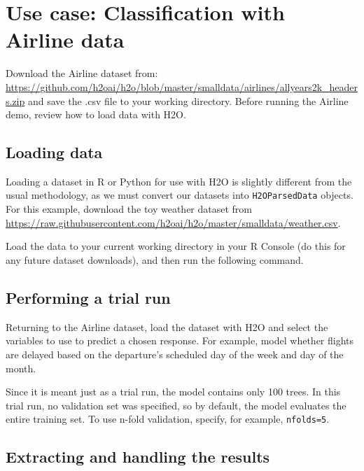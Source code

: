 \section{Use case: Classification with Airline data}

Download the Airline dataset from: {\url{https://github.com/h2oai/h2o/blob/master/smalldata/airlines/allyears2k_headers.zip}} and save the .csv file to your working directory. Before running the Airline demo, review how to load data with H2O.

\subsection{Loading data}

Loading a dataset in R or Python for use with H2O is slightly different from the usual methodology, as we must convert
our datasets into \texttt{H2OParsedData} objects. For this example, download the toy weather dataset from
{\url{https://raw.githubusercontent.com/h2oai/h2o/master/smalldata/weather.csv}}.

\waterExampleInR
Load the data to your current working directory in your R Console (do this for any future dataset downloads), and then run the following command.


\waterExampleInPython


\newpage
\subsection{Performing a trial run}
Returning to the Airline dataset, load the dataset with H2O and select the variables to use to predict a chosen
response. For example, model whether flights are delayed based on the departure's scheduled day of the week and day of
the month.

\waterExampleInR


\waterExampleInPython



\noindent
Since it is meant just as a trial run, the model contains only 100 trees. In this trial run, no validation set was
specified, so by default, the model evaluates the entire training set.  To use n-fold validation, specify, for example,
\texttt{nfolds=5}.

\newpage
\subsection{Extracting and handling the results}

